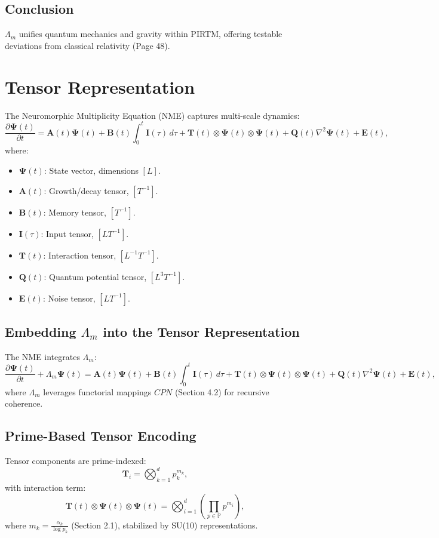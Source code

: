 \documentclass{article}
\theoremstyle{plain}
\begin{document}
\subsection{Conclusion}
\(\Lambda_m\) unifies quantum mechanics and gravity within PIRTM, offering testable deviations from classical relativity (Page 48).

\section{Tensor Representation}
The Neuromorphic Multiplicity Equation (NME) captures multi-scale dynamics:
\begin{equation}
\frac{\partial \bm{\Psi}(t)}{\partial t} = \bm{A}(t) \bm{\Psi}(t) + \bm{B}(t) \int_0^t \bm{I}(\tau) \, d\tau + \bm{T}(t) \otimes \bm{\Psi}(t) \otimes \bm{\Psi}(t) + \bm{Q}(t) \nabla^2 \bm{\Psi}(t) + \bm{E}(t),
\end{equation}
where:
\begin{itemize}
    \item \( \bm{\Psi}(t) \): State vector, dimensions \([L]\).
    \item \( \bm{A}(t) \): Growth/decay tensor, \([T^{-1}]\).
    \item \( \bm{B}(t) \): Memory tensor, \([T^{-1}]\).
    \item \( \bm{I}(\tau) \): Input tensor, \([L T^{-1}]\).
    \item \( \bm{T}(t) \): Interaction tensor, \([L^{-1} T^{-1}]\).
    \item \( \bm{Q}(t) \): Quantum potential tensor, \([L^3 T^{-1}]\).
    \item \( \bm{E}(t) \): Noise tensor, \([L T^{-1}]\).
\end{itemize}

\subsection{Embedding \(\Lambda_m\) into the Tensor Representation}
The NME integrates \(\Lambda_m\):
\begin{equation}
\frac{\partial \bm{\Psi}(t)}{\partial t} + \Lambda_m \bm{\Psi}(t) = \bm{A}(t) \bm{\Psi}(t) + \bm{B}(t) \int_0^t \bm{I}(\tau) \, d\tau + \bm{T}(t) \otimes \bm{\Psi}(t) \otimes \bm{\Psi}(t) + \bm{Q}(t) \nabla^2 \bm{\Psi}(t) + \bm{E}(t),
\end{equation}
where \(\Lambda_m\) leverages functorial mappings \( CPN \) (Section 4.2) for recursive coherence.

\subsection{Prime-Based Tensor Encoding}
Tensor components are prime-indexed:
\begin{equation}
\bm{T}_i = \bigotimes_{k=1}^d p_k^{m_k},
\end{equation}
with interaction term:
\begin{equation}
\bm{T}(t) \otimes \bm{\Psi}(t) \otimes \bm{\Psi}(t) = \bigotimes_{i=1}^d \left( \prod_{p \in \mathbb{P}} p^{m_i} \right),
\end{equation}
where \( m_k = \frac{\alpha_k}{\log p_k} \) (Section 2.1), stabilized by SU(10) representations.
\end{document}
